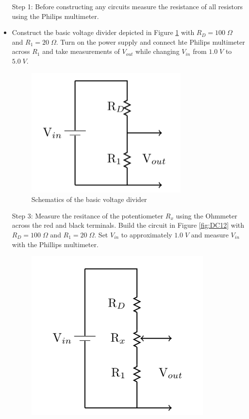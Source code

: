 \begin{itemize}[leftmargin = 50pt]
    \item[Step 1:] Before constructing any circuits measure the resistance of all resistors using the Philips multimeter.
    \item Construct the basic voltage divider depicted in Figure \ref{fig:DC11} with $R_D = 100\;\Omega$ and $R_1 = 20\;\Omega$. Turn on the power supply and connect hte Philips multimeter across $R_1$ and take measurements of $V_{out}$ while changing $V_{in}$ from $1.0\;V$ to $5.0\;V$. 

        \begin{figure}[H]
            \centering
            \includegraphics[scale = 0.8]{Images/DC11.PNG}
            \caption{Schematics of the basic voltage divider}
            \label{fig:DC11}
        \end{figure}
    \item[Step 3:] Measure the resitance of the potentiometer $R_x$ using the Ohmmeter across the red and black terminals. Build the circuit in Figure \ref{fig:DC12} with $R_D = 100\;\Omega$ and $R_1 = 20\;\Omega$. Set $V_{in}$ to approximately $1.0\;V$ and measure $V_{in}$ with the Phillips multimeter.
        \begin{figure}[H]
    \centering
    \includegraphics[scale = 0.8]{Images/DC12.PNG}

\end{figure}
\end{itemize}
